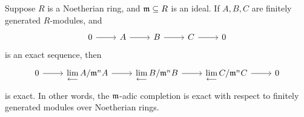 \begin{lemma}\label{lem:m-adic-invlim-exact}
    Suppose \(R\) is a Noetherian ring, and \(\mathfrak{m} \subseteq R\) is an ideal.
    If \(A,B,C\) are finitely generated \(R\)-modules, and
    \begin{equation*}
        \begin{tikzcd}
            0 \arrow{r} & A \arrow{r} & B \arrow{r} & C \arrow{r} & 0
        \end{tikzcd}
    \end{equation*}
    is an exact sequence, then
    \begin{equation*}
        \begin{tikzcd}
            0 \arrow{r} & \invlim A/\mfk{m}^n A \arrow{r} & \invlim B/\mfk{m}^n B \arrow{r} & \invlim C/\mfk{m}^n C \arrow{r} & 0
        \end{tikzcd}
    \end{equation*}
    is exact.
    In other words, the \(\mathfrak{m}\)-adic completion is exact with respect to finitely generated modules over Noetherian rings.
\end{lemma}

